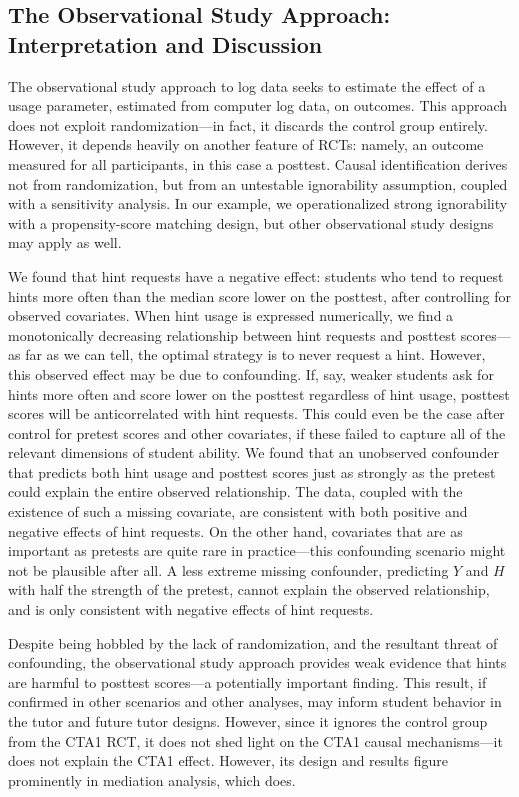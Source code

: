 \documentclass{article}
\begin{document}
\subsection{The Observational Study Approach: Interpretation and Discussion}
The observational study approach to log data seeks to estimate the
effect of a usage parameter, estimated from  computer log data, on
outcomes.
This approach does not exploit randomization---in fact, it discards
the control group entirely.
However, it depends heavily on another feature of RCTs: namely, an
outcome measured for all participants, in this case a posttest.
Causal identification derives not from randomization, but from an
untestable ignorability assumption, coupled with a sensitivity analysis.
In our example, we operationalized strong ignorability with a
propensity-score matching design, but other observational study
designs may apply as well.

We found that hint requests have a negative effect: students who tend
to request hints more often than the median score lower on the
posttest, after controlling for observed covariates.
When hint usage is expressed numerically, we find a monotonically
decreasing relationship between hint requests and posttest scores---as
far as we can tell, the optimal strategy is to never request a hint.
However, this observed effect may be due to confounding.
If, say, weaker students ask for hints more often and score lower
on the posttest regardless of hint usage, posttest scores will be
anticorrelated with hint requests.
This could even be the case after control for pretest scores and other
covariates, if these failed to capture all of the relevant dimensions
of student ability.
We found that an unobserved confounder that predicts both hint usage
and posttest scores just as strongly as the pretest could explain the
entire observed relationship.
The data, coupled with the existence of such a missing covariate, are
consistent with both positive and negative effects of hint requests.
On the other hand, covariates that are as important as pretests are
quite rare in practice---this confounding scenario might not be
plausible after all.
A less extreme missing confounder, predicting $Y$ and $H$ with half
the strength of the pretest, cannot explain the observed relationship,
and is only consistent with negative effects of hint requests.

Despite being hobbled by the lack of randomization, and the resultant
threat of confounding, the observational study approach provides weak
evidence that hints are harmful to posttest scores---a potentially
important finding.
This result, if confirmed in other scenarios and other analyses, may
inform student behavior in the tutor and future tutor designs.
However, since it ignores the control group from the CTA1 RCT, it does
not shed light on the CTA1 causal mechanisms---it does not explain the
CTA1 effect.
However, its design and results figure prominently in mediation
analysis, which does.
\end{document}
